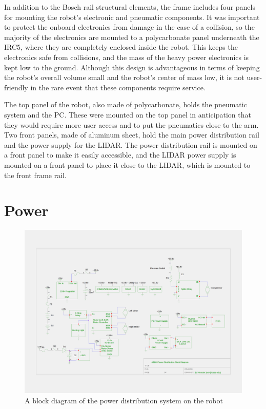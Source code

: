 \documentclass[]{cwru} %
\begin{document}
In addition to the Bosch rail structural elements, the frame includes
four panels for mounting the robot's electronic and pneumatic
components. It was important to protect the onboard electronics from
damage in the case of a collision, so the majority of the electronics
are mounted to a polycarbonate panel underneath the IRC5, where they are
completely enclosed inside the robot. This keeps the electronics safe
from collisions, and the mass of the heavy power electronics is kept low
to the ground. Although this design is advantageous in terms of keeping
the robot's overall volume small and the robot's center of mass low, it
is not user-friendly in the rare event that these components require
service.

The top panel of the robot, also made of polycarbonate, holds the
pneumatic system and the PC. These were mounted on the top panel in
anticipation that they would require more user access and to put the
pneumatics close to the arm. Two front panels, made of aluminum sheet,
hold the main power distribution rail and the power supply for the
LIDAR. The power distribution rail is mounted on a front panel to make
it easily accessible, and the LIDAR power supply is mounted on a front
panel to place it close to the LIDAR, which is mounted to the front
frame rail.

\section{Power}

\begin{figure}[ht]
\centering
\includegraphics[width=6.0in]{power_block_diagram}
\caption{A block diagram of the power distribution system on the robot}
\label{fig:power-schematic}
\end{figure}
\end{document}
